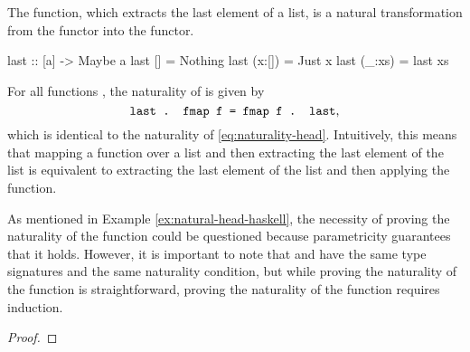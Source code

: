 \begin{example}
  \label{ex:natural-last-haskell}

  The  function, which extracts the last element of
  a list, is a natural transformation from the \texthaskell{[]}
  functor into the  functor.
  \begin{codehaskell}
    last :: [a] -> Maybe a
    last []     = Nothing
    last (x:[]) = Just x
    last (_:xs) = last xs
  \end{codehaskell}

  For all functions , the naturality of
   is given by
  \begin{equation}
    \label{eq:naturality-last}
    \text{\texttt{last . fmap f = fmap f . last}}
    \text{,}
  \end{equation}
  which is identical to the naturality of 
  \eqref{eq:naturality-head}. Intuitively, this means that mapping a
  function over a list and then extracting the last element of the
  list is equivalent to extracting the last element of the list and
  then applying the function.

  As mentioned in Example \ref{ex:natural-head-haskell}, the necessity
  of proving the naturality of the  function could
  be questioned because parametricity guarantees that it holds.
  However, it is important to note that  and
   have the same type signatures and the same
  naturality condition, but while proving the naturality of the
   function is straightforward, proving the
  naturality of the  function requires induction.

  \begin{proof}


\end{proof}
\end{example}
